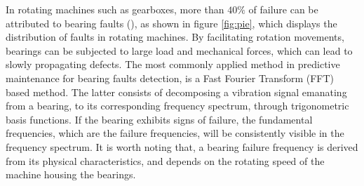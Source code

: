 \documentclass[../Main/thesis.tex]{subfiles}
\begin{document}
\justify
In rotating machines such as gearboxes, more than $40 \% $ of failure can be attributed to bearing faults (\cite{albrecht1986}), as shown in figure \ref{fig:pie}, which displays the distribution of faults in rotating machines. By facilitating rotation movements, bearings can be subjected to large load and mechanical forces, which can lead to slowly propagating defects. The most commonly applied method in predictive maintenance for bearing faults detection, is a Fast Fourier Transform (FFT) based method. The latter consists of decomposing a vibration signal emanating from a bearing, to its corresponding frequency spectrum, through trigonometric basis functions. If the bearing exhibits signs of failure, the fundamental frequencies, which are the failure frequencies, will be consistently visible in the frequency spectrum. It is worth noting that, a bearing failure frequency is derived from its physical characteristics, and depends on the rotating speed of the machine housing the bearings.
\end{document}
